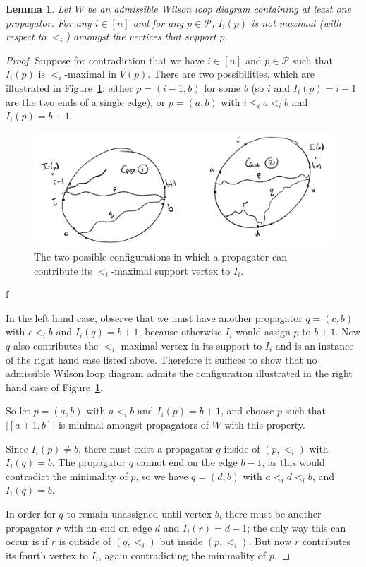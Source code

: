 \documentclass[11pt]{article}
\newcommand{\cP}{\mathcal{P}}
\newtheorem{lem}[thm]{Lemma}
\theoremstyle{remark}
\theoremstyle{definition}
\begin{document}
\begin{lem}\label{lem no fourth vertex}
Let $W$ be an admissible Wilson loop diagram containing at least one propagator. For any $i \in [n]$ and for any $p \in \cP$, $I_i(p)$ is not maximal (with respect to $<_i$) amongst the vertices that support $p$.
\end{lem}
\begin{proof}
Suppose for contradiction that we have $i \in [n]$ and $p \in \cP$ such that $I_i(p)$ is $<_i$-maximal in $V(p)$. There are two possibilities, which are illustrated in Figure~\ref{fig:no fourth vertex}: either $p = (i-1,b)$ for some $b$ (so $i$ and $I_i(p) = i-1$ are the two ends of a single edge), or $p = (a,b)$ with $i\leq_i a <_i b$ and $I_i(p) = b+1$.

\begin{figure}
\includegraphics[width=15cm]{4th_vertex}
\caption{The two possible configurations in which a propagator can contribute its $<_i$-maximal support vertex to $I_i$.}
\label{fig:no fourth vertex}
\end{figure}f

In the left hand case, observe that we must have another propagator $q = (c,b)$ with $c<_i b$ and $I_i(q) = b+1$, because otherwise $I_i$ would assign $p$ to $b+1$. Now $q$ also contributes the $<_i$-maximal vertex in its support to $I_i$ and is an instance of the right hand case listed above. Therefore it suffices to show that no admissible Wilson loop diagram admits the configuration illustrated in the right hand case of Figure~\ref{fig:no fourth vertex}.

So let $p = (a,b)$ with $a<_ib$ and $I_i(p) = b+1$, and choose $p$ such that $|[a+1,b]|$ is minimal amongst propagators of $W$ with this property.

Since $I_i(p) \neq b$, there must exist a propagator $q$ inside of $(p,<_i)$ with $I_i(q) = b$. The propagator $q$ cannot end on the edge $b-1$, as this would contradict the minimality of $p$, so we have $q = (d,b)$ with $a <_i d <_i b$, and $I_i(q) = b$. 

In order for $q$ to remain unassigned until vertex $b$, there must be another propagator $r$ with an end on edge $d$ and $I_i(r) = d+1$; the only way this can occur is if $r$ is outside of $(q,<_i)$ but inside $(p,<_i)$. But now $r$ contributes its fourth vertex to $I_i$, again contradicting the minimality of $p$.
\end{proof}
\end{document}
